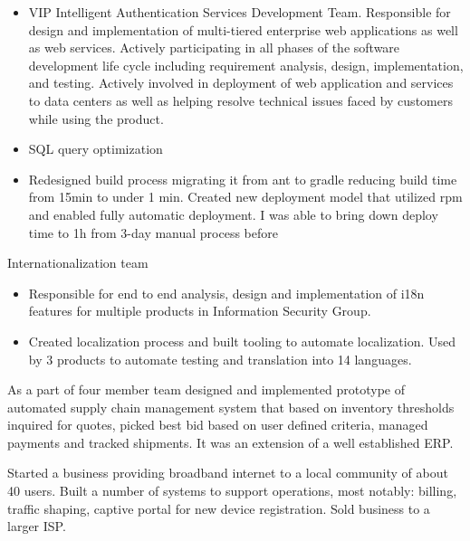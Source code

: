 \documentclass[11pt,a4paper,roman]{moderncv}       %
\begin{document}
\begin{itemize}
    \item VIP Intelligent Authentication Services Development Team. Responsible for design and implementation of multi-tiered enterprise web applications as well as web services. Actively participating in all phases of the software development life cycle including requirement analysis, design, implementation, and testing. Actively involved in deployment of web application and services to data centers as well as helping resolve technical issues faced by customers while using the product.
    \item SQL query optimization
    \item Redesigned build process migrating it from ant to gradle reducing build time from 15min to under 1 min. Created new deployment model that utilized rpm and enabled fully automatic deployment. I was able to bring down deploy time to 1h from 3-day manual process before
\end{itemize}

\vspace{6pt}

Internationalization team

\begin{itemize}
    \item Responsible for end to end analysis, design and implementation of i18n features for multiple products in Information Security Group.
    \item Created localization process and built tooling to automate localization. Used by 3 products to automate testing and translation into 14 languages.
\end{itemize}

\vspace{16pt}


As a part of four member team designed and implemented prototype of automated supply chain management system that based on inventory thresholds inquired for quotes, picked best bid based on user defined criteria, managed payments and tracked shipments. It was an extension of a well established ERP.

\vspace{16pt}


Started a business providing broadband internet to a local community of about 40 users. Built a number of systems to support operations, most notably: billing, traffic shaping, captive portal for new device registration. Sold business to a larger ISP.
\end{document}
